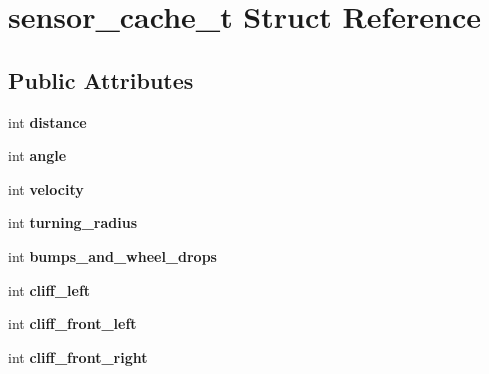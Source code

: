 \hypertarget{structsensor__cache__t}{\section{sensor\-\_\-cache\-\_\-t \-Struct \-Reference}
\label{structsensor__cache__t}
}
\subsection*{\-Public \-Attributes}
\begin{DoxyCompactItemize}
\item 
\hypertarget{structsensor__cache__t_a1bea919f418a84bd87ab5f9564e6945a}{int {\bfseries distance}}\label{structsensor__cache__t_a1bea919f418a84bd87ab5f9564e6945a}

\item 
\hypertarget{structsensor__cache__t_a919e51ba267e96f5061a4b3a224e707f}{int {\bfseries angle}}\label{structsensor__cache__t_a919e51ba267e96f5061a4b3a224e707f}

\item 
\hypertarget{structsensor__cache__t_a8db102a12566ef8eeb9cb20fe7f852b6}{int {\bfseries velocity}}\label{structsensor__cache__t_a8db102a12566ef8eeb9cb20fe7f852b6}

\item 
\hypertarget{structsensor__cache__t_a45b1a6e77713f0474b6af9706d02ebb1}{int {\bfseries turning\-\_\-radius}}\label{structsensor__cache__t_a45b1a6e77713f0474b6af9706d02ebb1}

\item 
\hypertarget{structsensor__cache__t_a030cb5aa1a37039ca6caf85495a49866}{int {\bfseries bumps\-\_\-and\-\_\-wheel\-\_\-drops}}\label{structsensor__cache__t_a030cb5aa1a37039ca6caf85495a49866}

\item 
\hypertarget{structsensor__cache__t_aa32d16f4bc3f6e77bc06038d23454f82}{int {\bfseries cliff\-\_\-left}}\label{structsensor__cache__t_aa32d16f4bc3f6e77bc06038d23454f82}

\item 
\hypertarget{structsensor__cache__t_a1bb9f8983daa66c746e2919d35a7f429}{int {\bfseries cliff\-\_\-front\-\_\-left}}\label{structsensor__cache__t_a1bb9f8983daa66c746e2919d35a7f429}

\item 
\hypertarget{structsensor__cache__t_a92eb9eea4373b48af86a3178707e0960}{int {\bfseries cliff\-\_\-front\-\_\-right}}\label{structsensor__cache__t_a92eb9eea4373b48af86a3178707e0960}


\end{DoxyCompactItemize}

